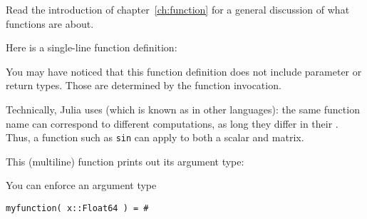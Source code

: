 
Read the introduction of chapter~\ref{ch:function} for a general
discussion of what functions are about.

Here is a single-line function definition:


You may have noticed that this function definition does not include
parameter or return types. Those are determined by the function invocation.

Technically,
Julia uses 
(which is known as  in other languages):
the same function name can correspond to different computations,
as long they  differ in their .
Thus, a function such as \lstinline{sin} can apply to both a scalar and matrix.

This (multiline) function prints out its argument type:
%

You can enforce an argument type
\begin{lstlisting}
myfunction( x::Float64 ) = #
\end{lstlisting}
\endinput

A~\indexterm{function}
(or~\emph{subprogram}\index{subprogram|see{function}}) is a way to
abbreviate a block of code and replace it by a single line.
This is foremost a code structuring device: by giving a function a
relevant name you introduce the terminology of your application into
your program.

\begin{itemize}
\item Find a block of code that has a clearly identifiable function.
\item Turn this into a function: the function definition will contain
  that block, plus a header and (maybe) a return statement.
\item The function definition is placed before the main program.
\item The function is called by its name.
\end{itemize}

